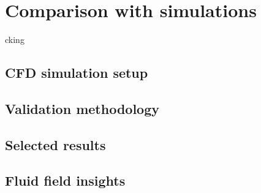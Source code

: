 \chapter{Comparison with simulations}cking 
\label{cap:cfd}

\noindent

\section{CFD simulation setup} %

\section{Validation methodology} %
\section{Selected results}
\section{Fluid field insights} %